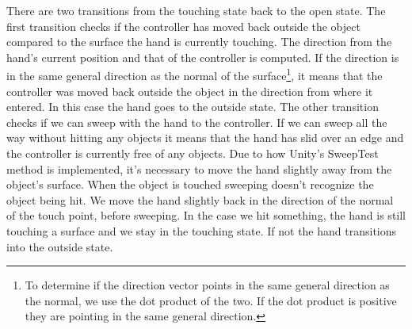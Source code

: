 There are two transitions from the touching state back to the open state. The first transition checks if the controller has moved back outside the object compared to the surface the hand is currently touching. The direction from the hand's current position and that of the controller is computed. If the direction is in the same general direction as the normal of the surface\footnote{To determine if the direction vector points in the same general direction as the normal, we use the dot product of the two. If the dot product is positive they are pointing in the same general direction.}, it means that the controller was moved back outside the object in the direction from where it entered. In this case the hand goes to the outside state. The other transition checks if we can sweep with the hand to the controller. If we can sweep all the way without hitting any objects it means that the hand has slid over an edge and the controller is currently free of any objects. Due to how Unity's SweepTest method is implemented, it's necessary to move the hand slightly away from the object's surface. When the object is touched sweeping doesn't recognize the object being hit. We move the hand slightly back in the direction of the normal of the touch point, before sweeping. In the case we hit something, the hand is still touching a surface and we stay in the touching state. If not the hand transitions into the outside state.

